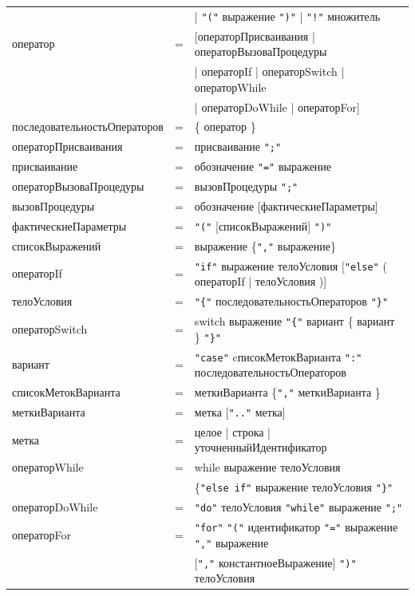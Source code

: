 \documentclass[a4paper,12pt]{article}
\newcommand{\lit}[1]{\texttt{"#1"}}
\begin{document}
\begin{center}
\begin{longtable}{l c l}
            & & | \lit{(} выражение \lit{)} | \lit{!} множитель \\
            оператор & = & [операторПрисваивания | операторВызоваПроцедуры \\
            & & | операторIf | операторSwitch | операторWhile \\
            & & | операторDoWhile | операторFor] \\
            последовательностьОператоров & = & \{ оператор \} \\
            операторПрисваивания & = & присваивание \lit{;} \\
            присваивание & = & обозначение \lit{=} выражение \\
            операторВызоваПроцедуры & = & вызовПроцедуры \lit{;} \\
            вызовПроцедуры & = & обозначение [фактическиеПараметры] \\
            фактическиеПараметры & = & \lit{(} [списокВыражений] \lit{)} \\
            списокВыражений & = & выражение \{\lit{,} выражение\} \\
            операторIf & = & \lit{if} выражение телоУсловия [\lit{else} ( операторIf | телоУсловия )]\\
            телоУсловия & = & \lit{\{} последовательностьОператоров \lit{\}} \\
            операторSwitch & = & switch выражение \lit{\{} вариант \{ вариант \} \lit{\}} \\
            вариант & = & \lit{case} cписокМетокВарианта \lit{:} последовательностьОператоров \\
            списокМетокВарианта & = & меткиВарианта \{\lit{,} меткиВарианта \} \\
            меткиВарианта & = & метка [\lit{..} метка] \\
            метка & = & целое | строка | уточненныйИдентификатор \\
            операторWhile & = & while выражение телоУсловия \\
            & & \{\lit{else if} выражение телоУсловия \lit{\}} \\
            операторDoWhile & = & \lit{do} телоУсловия \lit{while} выражение \lit{;} \\
            операторFor & = & \lit{for} \lit{(} идентификатор \lit{=} выражение \lit{,} выражение \\
            & & [\lit{,} константноеВыражение] \lit{)} телоУсловия \\

\end{longtable}
\end{center}
\end{document}
